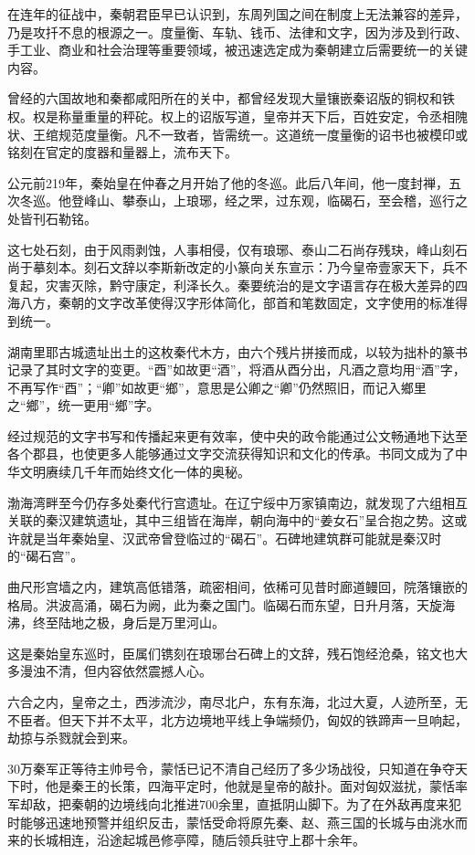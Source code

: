 在连年的征战中，秦朝君臣早已认识到，东周列国之间在制度上无法兼容的差异，乃是攻扦不息的根源之一。度量衡、车轨、钱币、法律和文字，因为涉及到行政、手工业、商业和社会治理等重要领域，被迅速选定成为秦朝建立后需要统一的关键内容。

曾经的六国故地和秦都咸阳所在的关中，都曾经发现大量镶嵌秦诏版的铜权和铁权。权是称量重量的秤砣。权上的诏版写道，皇帝并天下后，百姓安定，令丞相隗状、王绾规范度量衡。凡不一致者，皆需统一。这道统一度量衡的诏书也被模印或铭刻在官定的度器和量器上，流布天下。

公元前219年，秦始皇在仲春之月开始了他的冬巡。此后八年间，他一度封禅，五次冬巡。他登峰山、攀泰山，上琅琊，经之罘，过东观，临碣石，至会稽，巡行之处皆刊石勒铭。

这七处石刻，由于风雨剥蚀，人事相侵，仅有琅琊、泰山二石尚存残玦，峰山刻石尚于摹刻本。刻石文辞以李斯新改定的小篆向关东宣示：乃今皇帝壹家天下，兵不复起，灾害灭除，黔守康定，利泽长久。秦要统治的是文字语言存在极大差异的四海八方，秦朝的文字改革使得汉字形体简化，部首和笔数固定，文字使用的标准得到统一。

湖南里耶古城遗址出土的这枚秦代木方，由六个残片拼接而成，以较为拙朴的篆书记录了其时文字的变更。“酉”如故更“酒”，将酒从酉分出，凡酒之意均用“酒”字，不再写作“酉”；“卿”如故更“鄉”，意思是公卿之“卿”仍然照旧，而记入鄉里之“鄉”，统一更用“鄉”字。

经过规范的文字书写和传播起来更有效率，使中央的政令能通过公文畅通地下达至各个郡县，也使更多人能够通过文字交流获得知识和文化的传承。书同文成为了中华文明赓续几千年而始终文化一体的奥秘。

渤海湾畔至今仍存多处秦代行宫遗址。在辽宁绥中万家镇南边，就发现了六组相互关联的秦汉建筑遗址，其中三组皆在海岸，朝向海中的“姜女石”呈合抱之势。这或许就是当年秦始皇、汉武帝曾登临过的“碣石”。石碑地建筑群可能就是秦汉时的“碣石宫”。

曲尺形宫墙之内，建筑高低错落，疏密相间，依稀可见昔时廊道鳗回，院落镶嵌的格局。洪波高涌，碣石为阙，此为秦之国门。临碣石而东望，日升月落，天旋海沸，终至陆地之极，身后是万里河山。

这是秦始皇东巡时，臣属们镌刻在琅琊台石碑上的文辞，残石饱经沧桑，铭文也大多漫浊不清，但内容依然震撼人心。

六合之内，皇帝之土，西涉流沙，南尽北户，东有东海，北过大夏，人迹所至，无不臣者。但天下并不太平，北方边境地平线上争端频仍，匈奴的铁蹄声一旦响起，劫掠与杀戮就会到来。

30万秦军正等待主帅号令，蒙恬已记不清自己经历了多少场战役，只知道在争夺天下时，他是秦王的长策，四海平定时，他就是皇帝的敲扑。面对匈奴滋扰，蒙恬率军却敌，把秦朝的边境线向北推进700余里，直抵阴山脚下。为了在外敌再度来犯时能够迅速地预警并组织反击，蒙恬受命将原先秦、赵、燕三国的长城与由洮水而来的长城相连，沿途起城邑修亭障，随后领兵驻守上郡十余年。

